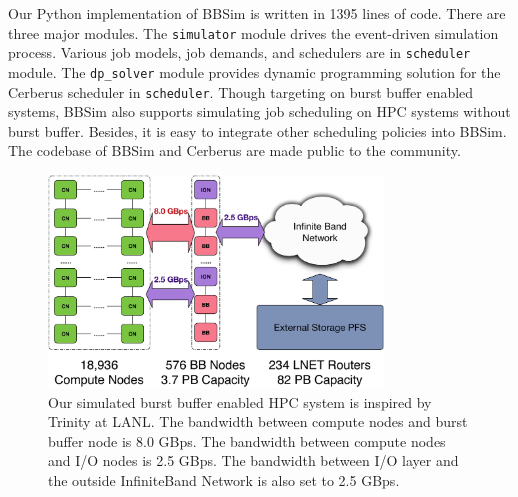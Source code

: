 Our Python implementation of BBSim is written in 1395 lines of code.
There are three major modules.
The \texttt{simulator} module drives the event-driven simulation process.
Various job models, job demands, and schedulers are in \texttt{scheduler} module.
The \texttt{dp\_solver} module provides dynamic programming solution for
the Cerberus scheduler in \texttt{scheduler}.
Though targeting on burst buffer enabled systems,
BBSim also supports simulating job scheduling on HPC systems without burst buffer.
Besides, it is easy to integrate other scheduling policies into BBSim.
The codebase of BBSim and Cerberus are made public to the community\cite{bbsim-github}.

\begin{figure}[htp]
        \centering
        \includegraphics[width=3.5in]{BBArchitecturewithBandwidth}
        \caption{Our simulated burst buffer enabled HPC system is inspired by Trinity at LANL. The bandwidth between compute nodes and burst buffer node is 8.0 GBps. The bandwidth between compute nodes and I/O nodes is 2.5 GBps. The bandwidth between I/O layer and the outside InfiniteBand Network is also set to 2.5 GBps.}
        \label{Fig:BBArchitecture}
\end{figure}







